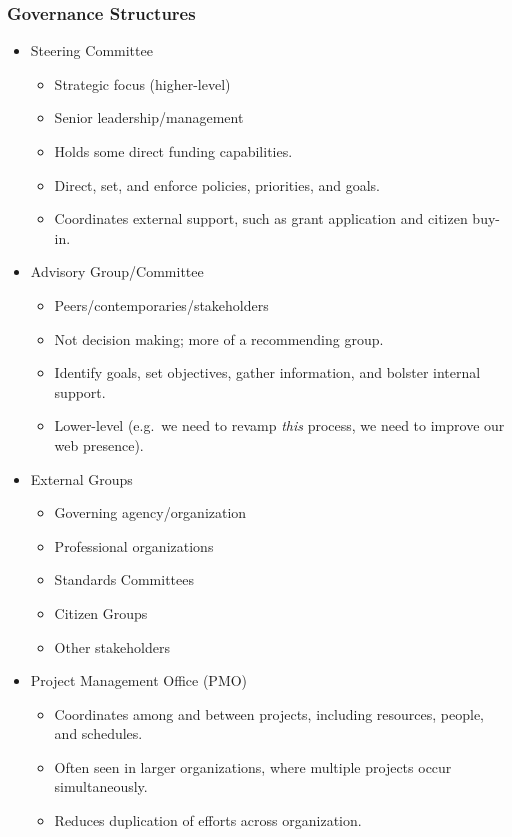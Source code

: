 \documentclass[
  letterpaper,
  DIV=11,
  numbers=noendperiod]{scrartcl}
\providecommand{\tightlist}{%
  \setlength{\itemsep}{0pt}\setlength{\parskip}{0pt}}\usepackage{longtable,booktabs,array}
\begin{document}
\subsubsection{Governance Structures}\label{governance-structures}

\begin{itemize}
\tightlist
\item
  Steering Committee

  \begin{itemize}
  \tightlist
  \item
    Strategic focus (higher-level)
  \item
    Senior leadership/management
  \item
    Holds some direct funding capabilities.
  \item
    Direct, set, and enforce policies, priorities, and goals.
  \item
    Coordinates external support, such as grant application and citizen
    buy-in.
  \end{itemize}
\item
  Advisory Group/Committee

  \begin{itemize}
  \tightlist
  \item
    Peers/contemporaries/stakeholders
  \item
    Not decision making; more of a recommending group.
  \item
    Identify goals, set objectives, gather information, and bolster
    internal support.
  \item
    Lower-level (e.g.~we need to revamp \emph{this} process, we need to
    improve our web presence).
  \end{itemize}
\item
  External Groups

  \begin{itemize}
  \tightlist
  \item
    Governing agency/organization
  \item
    Professional organizations
  \item
    Standards Committees
  \item
    Citizen Groups
  \item
    Other stakeholders
  \end{itemize}
\item
  Project Management Office (PMO)

  \begin{itemize}
  \tightlist
  \item
    Coordinates among and between projects, including resources, people,
    and schedules.
  \item
    Often seen in larger organizations, where multiple projects occur
    simultaneously.
  \item
    Reduces duplication of efforts across organization.
  \end{itemize}
\end{itemize}
\end{document}
